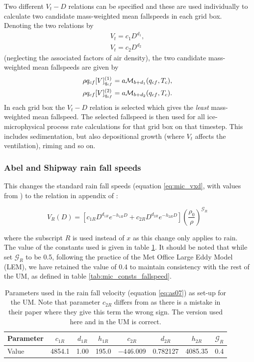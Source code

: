 \documentclass{UMDP_article}
\def\bq{\begin{equation}}
\def\eq{\end{equation}}
\begin{document}
Two different $V_t-D$ relations can be specified and these are
used individually to calculate two candidate mass-weighted mean
fallspeeds in each grid box. Denoting the two relations by
\begin{eqnarray}
\label{eq:split_vtd}
V_t = c_1 D^{d_1}, \\
V_t = c_2 D^{d_2}
\end{eqnarray}
(neglecting the associated factors of air density), the
two candidate mass-weighted mean fallspeeds are given by
\begin{eqnarray}
\label{eq:split_vm}
\rho q_{cf} [V]^{(1)}_{q_{cf}} = a{\cal M}_{b+d_1}(q_{cf},T_c),\\
\rho q_{cf} [V]^{(2)}_{q_{cf}} = a{\cal M}_{b+d_2}(q_{cf},T_c).
\end{eqnarray}
In each grid box the $V_t-D$ relation is selected which gives
the {\it least} mass-weighted mean fallspeed. The selected fallspeed is
then used for all ice-microphysical process rate calculations
for that grid box on that timestep. This includes sedimentation,
but also depositional growth (where $V_t$ affects the ventilation),
riming and so on.


\subsubsection{Abel and Shipway  rain fall speeds}
\label{sec:as07}

This changes the standard
rain fall speeds (equation \ref{eq:mic_vxd}, with values from 
\citealp{Sachidananda:Zrnic:1986}) to the relation in appendix of 
\cite{Abel:Shipway:2007}:

\bq
\label{eq:as07}
V_R(D)=\left[c_{1R}D^{d_{1R}} e^{-h_{1R}D} + c_{2R}D^{d_{2R}} e^{-h_{2R}D} 
\right] \left( \frac{\rho_0}{\rho}\right) ^{\mathcal{G}_{R}}
\eq

where the subscript $R$ is used instead of $x$ as this change only applies to
rain. The value of the constants used is given in table \ref{tab:as07}. It
should be noted that while \cite{Abel:Shipway:2007} set $\mathcal{G}_R$ to be 
0.5, following the practice of the Met Office Large Eddy Model (LEM), we have
retained the value of 0.4 to maintain consistency with the rest of the UM, as
defined in table \ref{tab:mic_consts_fallspeed}. 

\begin{table}[ht!]
\begin{center}
\begin{tabular}{lccccccc}
\hline
Parameter & $c_{1R}$ & $d_{1R}$ & $h_{1R}$ & $c_{2R}$ & $d_{2R}$  & $h_{2R}$ 
& $\mathcal{G}_R$ \\
\hline
Value     & 4854.1   &  1.00   & 195.0   & $-446.009$ & 0.782127 & 4085.35 
& 0.4 \\
\hline
\end{tabular}
\end{center}
\caption{Parameters used in the \cite{Abel:Shipway:2007} rain fall velocity 
(equation \ref{eq:as07}) as set-up for the UM. Note that parameter $c_{2R}$ differs 
from \cite{Abel:Shipway:2007} as there is a mistake in their paper where they 
give this term the wrong sign. The version used here and in the UM is correct.} 
\label{tab:as07}
\end{table}
\end{document}

